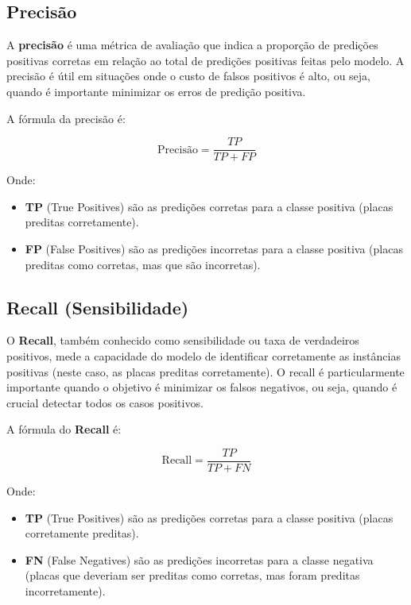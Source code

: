 \documentclass[conference]{IEEEtran}
\begin{document}
\subsection{Precisão}

A \textbf{precisão} é uma métrica de avaliação que indica a proporção de predições positivas corretas em relação ao total de predições positivas feitas pelo modelo. A precisão é útil em situações onde o custo de falsos positivos é alto, ou seja, quando é importante minimizar os erros de predição positiva.

A fórmula da precisão é:

\[
\text{Precisão} = \frac{TP}{TP + FP}
\]

Onde:

\begin{itemize}
	\item \textbf{TP} (True Positives) são as predições corretas para a classe positiva (placas preditas corretamente).
	\item \textbf{FP} (False Positives) são as predições incorretas para a classe positiva (placas preditas como corretas, mas que são incorretas).
\end{itemize}

\subsection{Recall (Sensibilidade)}

O \textbf{Recall}, também conhecido como sensibilidade ou taxa de verdadeiros positivos, mede a capacidade do modelo de identificar corretamente as instâncias positivas (neste caso, as placas preditas corretamente). O recall é particularmente importante quando o objetivo é minimizar os falsos negativos, ou seja, quando é crucial detectar todos os casos positivos.

A fórmula do \textbf{Recall} é:

\[
\text{Recall} = \frac{TP}{TP + FN}
\]

Onde:

\begin{itemize}
	\item \textbf{TP} (True Positives) são as predições corretas para a classe positiva (placas corretamente preditas).
	\item \textbf{FN} (False Negatives) são as predições incorretas para a classe negativa (placas que deveriam ser preditas como corretas, mas foram preditas incorretamente).
\end{itemize}
\end{document}
